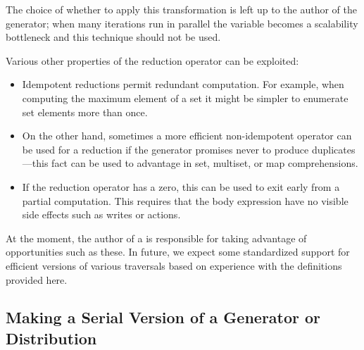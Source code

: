 The choice of whether to apply this transformation is left up to the
author of the generator; when many iterations run in parallel the
 variable becomes a scalability bottleneck and this
technique should not be used.

Various other properties of the reduction operator can be exploited:
\begin{itemize}
\item Idempotent reductions permit redundant computation.  For
  example, when computing the maximum element of a set it might be
  simpler to enumerate set elements more than once.

\item On the other hand, sometimes a more efficient non-idempotent
  operator can be used for a reduction if the generator promises never
  to produce duplicates---this fact can be used to advantage in set,
  multiset, or map comprehensions.

\item If the reduction operator has a zero, this can be used to exit
  early from a partial computation.  This requires that the body
  expression have no visible side effects such as writes or  actions.
\end{itemize}

At the moment, the author of a  is responsible for
taking advantage of opportunities such as these.  In future, we expect
some standardized support for efficient versions of various traversals
based on experience with the definitions provided here.

\subsection{Making a Serial Version of a Generator or Distribution}


